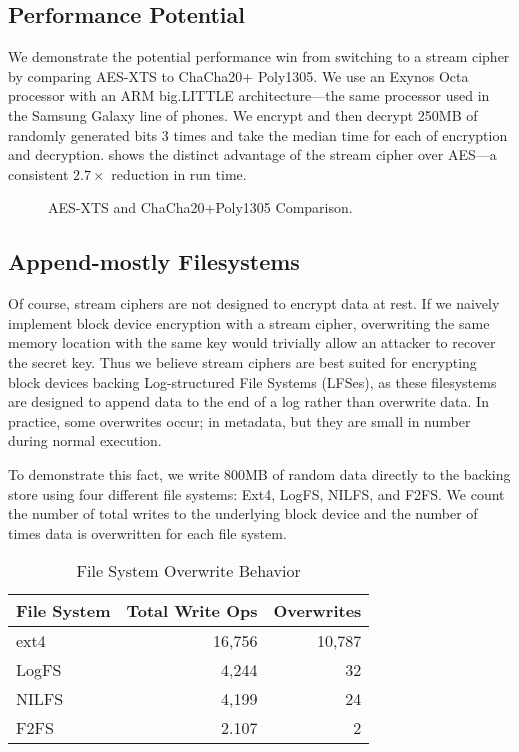 \subsection{Performance Potential}

We demonstrate the potential performance win from switching to a stream cipher
by comparing AES-XTS to ChaCha20+ Poly1305. We use an Exynos Octa processor with
an ARM big.LITTLE architecture---the same processor used in the Samsung Galaxy
line of phones. We encrypt and then decrypt 250MB of randomly generated bits 3
times and take the median time for each of encryption and decryption.
 shows the distinct advantage of the stream cipher over
AES---a consistent $2.7\times$ reduction in run time.

\begin{figure}[ht]
  \centering
  
\caption{AES-XTS and ChaCha20+Poly1305 Comparison.} \label{fig:motivation}
\end{figure}

\subsection{Append-mostly Filesystems}
Of course, stream ciphers are not designed to encrypt data at rest.
If we naively implement block device encryption with a stream cipher,
overwriting the same memory location with the same key would trivially
allow an attacker to recover the secret key. Thus we believe stream
ciphers are best suited for encrypting block devices backing
Log-structured File Systems (LFSes), as these filesystems are designed
to append data to the end of a log rather than overwrite data. In
practice, some overwrites occur; \eg in metadata, but they are small
in number during normal execution.

To demonstrate this fact, we write 800MB of random data directly to the backing
store using four different file systems: Ext4, LogFS, NILFS, and F2FS. We count
the number of total writes to the underlying block device and the number of
times data is overwritten for each file system.


\begin{table}[th]
\caption{File System Overwrite Behavior} \label{tbl:overwrites}
\footnotesize
\centering
\begin{tabular}{lrr}
  \textbf{File System} & \textbf{Total Write Ops} & \textbf{Overwrites} \\
  \hline
  \hline
  ext4    &  16,756 & 10,787\\
  LogFS   &   4,244 &     32\\
  NILFS   &   4,199 &     24\\
  F2FS    &   2.107 &      2\\
  \hline
  \hline
\end{tabular}
\end{table}

